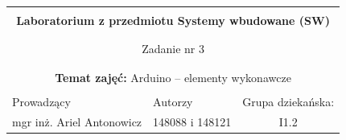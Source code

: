 \documentclass[polish,a4paper]{article}
\begin{document}
	\begin{center}
		\begin{tabular}{ p{} p{} p{} p{} p{} }
			
			&   &   &   &  \\
			\hline
			\multicolumn{5}{|c|}{}\\[-1ex]
			\multicolumn{5}{|c|}{{\LARGE \textbf{Laboratorium z przedmiotu Systemy wbudowane (SW)}}}\\
			\multicolumn{5}{|c|}{}\\[-1ex]
			\hline
			\hline
			
			\multicolumn{5}{|c|}{}\\[-1ex]
			\multicolumn{5}{|c|}{{\LARGE Zadanie nr 3}}\\
			\multicolumn{5}{|c|}{}\\[-1ex]
			\hline
			\hline
			
			\multicolumn{5}{|c|}{}\\[-1ex]
			\multicolumn{5}{|c|}{{\textbf{Temat zajęć:} Arduino – elementy wykonawcze}}\\
			\multicolumn{5}{|c|}{}\\[-1ex]
			\hline
			\hline
			
			\multicolumn{1}{|l|}{Prowadzący} &
			\multicolumn{2}{|l|}{Autorzy} &
			\multicolumn{2}{|l|}{Grupa dziekańska:} \\
			\multicolumn{1}{|c|}{mgr inż. Ariel Antonowicz} &
			\multicolumn{2}{|c|}{148088 i 148121} &
			\multicolumn{2}{|c|}{I1.2} \\
			\hline
			\hline
		\end{tabular}
	\end{center}
	\[\]
\end{document}
